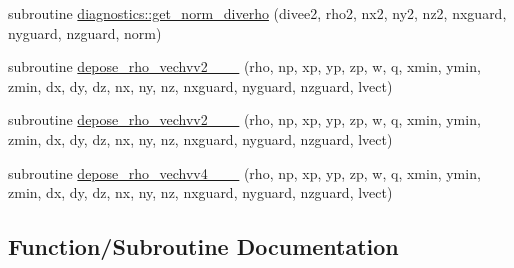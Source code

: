 \begin{DoxyCompactItemize}
subroutine \hyperlink{namespacediagnostics_a39c7463e667e97124ccb0c85381e6d03}{diagnostics\+::get\+\_\+norm\+\_\+diverho} (divee2, rho2, nx2, ny2, nz2, nxguard, nyguard, nzguard, norm)
\item 
subroutine \hyperlink{diags_8_f90_ac2886f000a8f1c1cb0b75ca5e3f3aba0}{depose\+\_\+rho\+\_\+vechvv2\+\_\+\_\+\_} (rho, np, xp, yp, zp, w, q, xmin, ymin, zmin, dx, dy, dz, nx, ny, nz,                                                                           nxguard, nyguard, nzguard, lvect)
\item 
subroutine \hyperlink{diags_8_f90_a00bf7b32c938f1d5e9f87830ee92d7e2}{depose\+\_\+rho\+\_\+vechvv2\+\_\+\_\+\_} (rho, np, xp, yp, zp, w, q, xmin, ymin, zmin,                                               dx, dy, dz, nx, ny, nz, nxguard, nyguard, nzguard, lvect)
\item 
subroutine \hyperlink{diags_8_f90_ae7646850feb6d4f841185fbfffc3d37c}{depose\+\_\+rho\+\_\+vechvv4\+\_\+\_\+\_} (rho, np, xp, yp, zp, w, q, xmin, ymin, zmin,                                                                                                                                                       dx, dy, dz, nx, ny, nz, nxguard, nyguard, nzguard, lvect)
\end{DoxyCompactItemize}


\subsection{Function/\+Subroutine Documentation}

